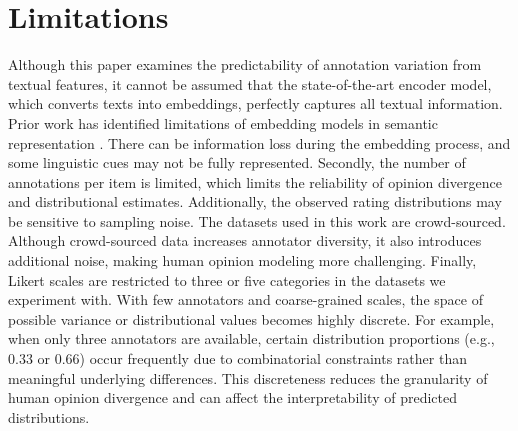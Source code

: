 \documentclass{article} %
\begin{document}



\section*{Limitations}


Although this paper examines the predictability of annotation variation from textual features, it cannot be assumed that the state-of-the-art encoder model, which converts texts into embeddings, perfectly captures all textual information. Prior work has identified limitations of embedding models in semantic representation \citep{lucy-gauthier-2017-distributional,zhang-etal-2024-unveiling,zhang-coltekin-2024-tubingen}. There can be information loss during the embedding process, and some linguistic cues may not be fully represented. Secondly, the number of annotations per item is limited, which limits the reliability of opinion divergence and distributional estimates. Additionally, the observed rating distributions may be sensitive to sampling noise. The datasets used in this work are crowd-sourced. Although crowd-sourced data increases annotator diversity, it also introduces additional noise, making human opinion modeling more challenging.
Finally, Likert scales are restricted to three or five categories in the datasets we experiment with. With few annotators and coarse-grained scales, the space of possible variance or distributional values becomes highly discrete. For example, when only three annotators are available, certain distribution proportions (e.g., 0.33 or 0.66) occur frequently due to combinatorial constraints rather than meaningful underlying differences. This discreteness reduces the granularity of human opinion divergence and can affect the interpretability of predicted distributions.
\end{document}

